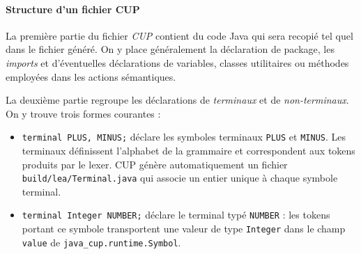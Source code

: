 \documentclass{td}
\begin{document}
\begin{exercice}
\begin{center}
  \end{center}
  
  \paragraph{Structure d'un fichier CUP}
  La première partie du fichier \emph{CUP} contient du code Java
  qui sera recopié tel quel dans le fichier généré.
  On y place généralement la déclaration de package, les \emph{imports}
  et d'éventuelles déclarations de variables, classes utilitaires
  ou méthodes employées dans les actions sémantiques.
  
  La deuxième partie regroupe les déclarations de \emph{terminaux} et de
  \emph{non-terminaux}. On y trouve trois formes courantes :
  \begin{itemize}
  \item \lstinline|terminal PLUS, MINUS;| déclare les symboles terminaux
    \lstinline|PLUS| et \lstinline|MINUS|.
    Les terminaux définissent l'alphabet de la grammaire et
    correspondent aux tokens produits par le lexer.
    CUP génère automatiquement un fichier \lstinline|build/lea/Terminal.java|
    qui associe un entier unique à chaque symbole terminal.

  \item \lstinline|terminal Integer NUMBER;| déclare le terminal typé
    \lstinline|NUMBER| : les tokens portant ce symbole transportent
    une valeur de type \lstinline|Integer| dans le champ \lstinline|value|
    de \lstinline|java_cup.runtime.Symbol|.


\end{itemize}
\end{exercice}
\end{document}
